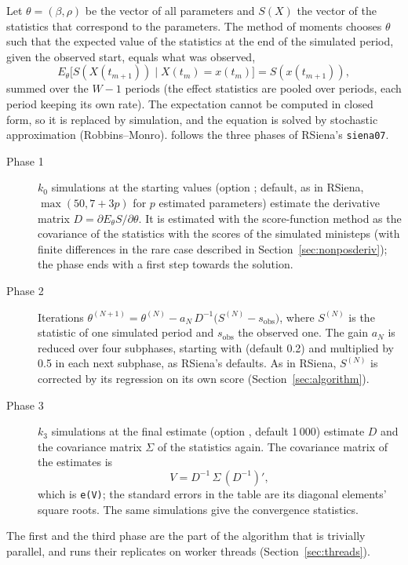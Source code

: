 Let $\theta=(\beta,\rho)$ be the vector of all parameters and $S(X)$ the vector of the statistics that correspond to the parameters. The method of moments chooses $\theta$ such that the expected value of the statistics at the end of the simulated period, given the observed start, equals what was observed,
\begin{equation}
  E_\theta\bigl[S(X(t_{m+1}))\mid X(t_m)=x(t_m)\bigr]=S(x(t_{m+1})) ,
  \label{eq:mom}
\end{equation}
summed over the $W-1$ periods (the effect statistics are pooled over periods, each period keeping its own rate). The expectation cannot be computed in closed form, so it is replaced by simulation, and the equation is solved by stochastic approximation (Robbins--Monro). \nwsaom{} follows the three phases of RSiena's \texttt{siena07}.
\begin{description}
  \item[Phase 1] $k_0$ simulations at the starting values (option ; default, as in RSiena, $\max(50, 7+3p)$ for $p$ estimated parameters) estimate the derivative matrix $D=\partial E_\theta S/\partial\theta$. It is estimated with the score-function method as the covariance of the statistics with the scores of the simulated ministeps (with finite differences in the rare case described in Section~\ref{sec:nonposderiv}); the phase ends with a first step towards the solution.
  \item[Phase 2] Iterations $\theta^{(N+1)}=\theta^{(N)}-a_N\,D^{-1}\bigl(S^{(N)}-s_{\mathrm{obs}}\bigr)$, where $S^{(N)}$ is the statistic of one simulated period and $s_{\mathrm{obs}}$ the observed one. The gain $a_N$ is reduced over four subphases, starting with  (default 0.2) and multiplied by 0.5 in each next subphase, as RSiena's defaults. As in RSiena, $S^{(N)}$ is corrected by its regression on its own score (Section~\ref{sec:algorithm}).
  \item[Phase 3] $k_3$ simulations at the final estimate (option , default 1\,000) estimate $D$ and the covariance matrix $\Sigma$ of the statistics again. The covariance matrix of the estimates is
  \begin{equation}
    V = D^{-1}\,\Sigma\,(D^{-1})' ,
  \end{equation}
  which is \texttt{e(V)}; the standard errors in the table are its diagonal elements' square roots. The same simulations give the convergence statistics.
\end{description}
The first and the third phase are the part of the algorithm that is trivially parallel, and \nwsaom{} runs their replicates on worker threads (Section~\ref{sec:threads}).

